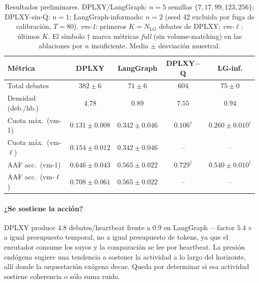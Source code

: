 \documentclass{llncs}
\begin{document}
\begin{table}[H]
\caption{Resultados preliminares. DPLXY/LangGraph: $n{=}5$ semillas
$\{7,17,99,123,256\}$; DPLXY-sin-Q: $n{=}1$; LangGraph-informado:
$n{=}2$ (seed 42 excluida por fuga de calibraci\'on, $T{=}80$).
\emph{vm-1}: primeros $K{=}N_{\text{LG}}$ debates de DPLXY;
\emph{vm-$\ell$}: \'ultimos $K$. El s\'imbolo $\dagger$ marca
m\'etricas \emph{full} (sin volume-matching) en las ablaciones por
$n$ insuficiente. Media $\pm$ desviaci\'on muestral.}
\label{tab:results-short}
\centering\small
\begin{tabular}{|l|c|c|c|c|}
\hline
\textbf{M\'etrica} & \textbf{DPLXY} & \textbf{LangGraph} & \textbf{DPLXY$-$Q} & \textbf{LG-inf.} \\
\hline
Total debates                      & $382\pm6$        & $71\pm6$          & $604$            & $75\pm0$         \\
Densidad (deb./hb.)                & $4.78$           & $0.89$            & $7.55$           & $0.94$           \\
Cuota m\'ax.\ (vm-1)               & $0.131\pm0.008$  & $0.342\pm0.046$   & $0.106^\dagger$  & $0.260\pm0.010^\dagger$ \\
Cuota m\'ax.\ (vm-$\ell$)          & $0.154\pm0.012$  & $0.342\pm0.046$   & --               & --               \\
AAF acc.\ (vm-1)                   & $0.646\pm0.043$  & $0.565\pm0.022$   & $0.729^\dagger$  & $0.540\pm0.010^\dagger$ \\
AAF acc.\ (vm-$\ell$)              & $0.708\pm0.061$  & $0.565\pm0.022$   & --               & --               \\
\hline
\end{tabular}
\end{table}

\paragraph{¿Se sostiene la acci\'on?} DPLXY produce $4.8$
debates/heartbeat frente a $0.9$ en LangGraph ---factor
$5.4\times$ a igual presupuesto temporal, no a igual presupuesto de
tokens, ya que el enrutador consume los suyos y la comparaci\'on se
lee por heartbeat. La presi\'on end\'ogena sugiere una tendencia a
sostener la actividad a lo largo del horizonte, all\'i donde la
orquestaci\'on ex\'ogena decae. Queda por determinar si esa
actividad sostiene coherencia o s\'olo suma ruido.
\end{document}
